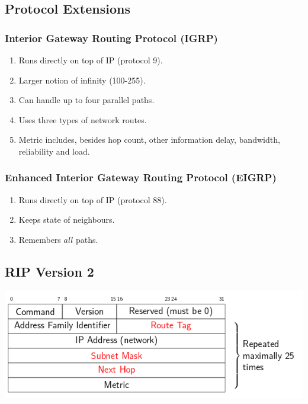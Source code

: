 \documentclass{article}
\begin{document}
\subsection{Protocol Extensions}


\subsubsection{Interior Gateway Routing Protocol (IGRP)}

\begin{enumerate}
	\item Runs directly on top of IP (protocol 9).
	\item Larger notion of infinity (100-255).
	\item Can handle up to four parallel paths.
	\item Uses three types of network routes.
	\item Metric includes, besides hop count, other information {delay, bandwidth, reliability and load}.
\end{enumerate}





\subsubsection{Enhanced Interior Gateway Routing Protocol (EIGRP)}

\begin{enumerate}
	\item Runs directly on top of IP (protocol 88).
	\item Keeps state of neighbours.
	\item Remembers $all$ paths.
\end{enumerate}

\subsection{RIP Version 2}


\centerline{\includegraphics[scale=0.5]{images/RIPv2.png}\\[1cm]}
\end{document}
